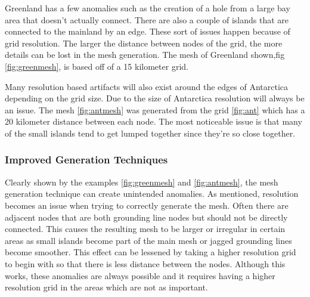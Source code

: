 Greenland has a few anomalies such as the creation of a hole from a large bay area that doesn't actually connect.  There are also a couple of islands that are connected to the mainland by an edge.  These sort of issues happen because of grid resolution.  The larger the distance between nodes of the grid, the more details can be lost in the mesh generation.  The mesh of Greenland shown,fig \ref{fig:greenmesh}, is based off of a 15 kilometer grid.


Many resolution based artifacts will also exist around the edges of Antarctica depending on the grid size.  Due to the size of Antarctica resolution will always be an issue.  The mesh \ref{fig:antmesh} was generated from the grid \ref{fig:ant} which has a 20 kilometer distance between each node.  The most noticeable issue is that many of the small islands tend to get lumped together since they're so close together.  





\subsubsection{Improved Generation Techniques}

Clearly shown by the examples \ref{fig:greenmesh} and \ref{fig:antmesh}, the mesh generation technique can create unintended anomalies.  As mentioned, resolution becomes an issue when trying to correctly generate the mesh. Often there are adjacent nodes that are both grounding line nodes but should not be directly connected.  This causes the resulting mesh to be larger or irregular in certain areas as small islands become part of the main mesh or jagged grounding lines become smoother.  This effect can be lessened by taking a higher resolution grid to begin with so that there is less distance between the nodes.  Although this works, these anomalies are always possible and it requires having a higher resolution grid in the areas which are not as important.


